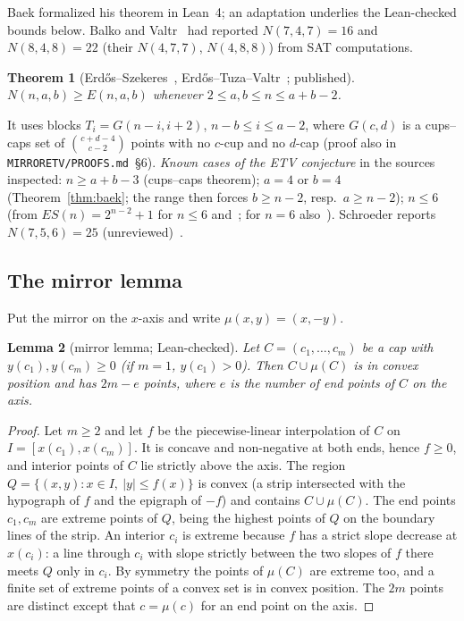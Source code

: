\documentclass[10pt]{article}
\newtheorem{theorem}{Theorem}[section]
\newtheorem{lemma}[theorem]{Lemma}
\theoremstyle{definition}
\theoremstyle{remark}
\newcommand{\dirn}[1]{{\upshape\nolinkurl{#1}}}
\begin{document}
Baek formalized his theorem in Lean~4; an adaptation underlies the Lean-checked bounds below. Balko and
Valtr~\cite{BV15} had reported $N(7,4,7)=16$ and $N(8,4,8)=22$ (their $N(4,7,7)$, $N(4,8,8)$) from SAT computations.

\begin{theorem}[Erd\H{o}s--Szekeres~\cite{ES61}, Erd\H{o}s--Tuza--Valtr~\cite{ETV96}; published]\label{thm:etvlower}
$N(n,a,b)\ge E(n,a,b)$ whenever $2\le a,b\le n\le a+b-2$.
\end{theorem}

It uses blocks $T_i=G(n-i,i+2)$, $n-b\le i\le a-2$, where $G(c,d)$ is a cups--caps set of $\binom{c+d-4}{c-2}$ points
with no $c$-cup and no $d$-cap (proof also in \dirn{MIRRORETV/PROOFS.md}~\S6). \emph{Known cases of the ETV conjecture}
in the sources inspected: $n\ge a+b-3$ (cups--caps theorem); $a=4$ or $b=4$ (Theorem~\ref{thm:baek}; the range then
forces $b\ge n-2$, resp.\ $a\ge n-2$); $n\le6$ (from $ES(n)=2^{n-2}+1$ for $n\le6$ and~\cite[Thm.~1.5]{Bae25}; for $n=6$
also~\cite{BV15}). Schroeder reports $N(7,5,6)=25$
(unreviewed)~\cite{Sch26}.

\subsection{The mirror lemma}

Put the mirror on the $x$-axis and write $\mu(x,y)=(x,-y)$.

\begin{lemma}[mirror lemma; Lean-checked]\label{lem:mirror}
Let $C=(c_1,\dots,c_m)$ be a cap with $y(c_1),y(c_m)\ge0$ (if $m=1$, $y(c_1)>0$). Then $C\cup\mu(C)$ is in convex
position and has $2m-e$ points, where $e$ is the number of end points of $C$ on the axis.
\end{lemma}

\begin{proof}
Let $m\ge2$ and let $f$ be the piecewise-linear interpolation of $C$ on $I=[x(c_1),x(c_m)]$. It is concave and
non-negative at both ends, hence $f\ge0$, and interior points of $C$ lie strictly above the axis. The region
$Q=\{(x,y):x\in I,\ |y|\le f(x)\}$ is convex (a strip intersected with the hypograph of $f$ and the epigraph of $-f$)
and contains $C\cup\mu(C)$. The end points $c_1,c_m$ are extreme points of $Q$, being the highest points of $Q$ on the
boundary lines of the strip. An interior $c_i$ is extreme because $f$ has a strict slope decrease at $x(c_i)$: a line
through $c_i$ with slope strictly between the two slopes of $f$ there meets $Q$ only in $c_i$. By symmetry the points of
$\mu(C)$ are extreme too, and a finite set of extreme points of a convex set is in convex position. The $2m$ points are
distinct except that $c=\mu(c)$ for an end point on the axis.
\end{proof}
\end{document}
